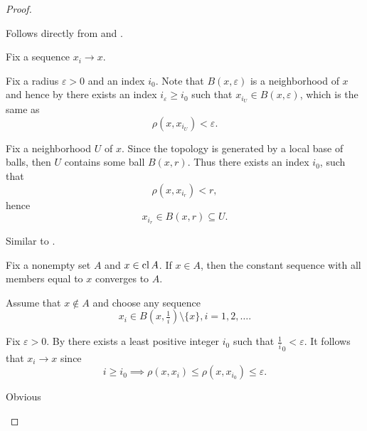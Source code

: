 \begin{proof}\mbox{}
  \begin{description}
     Follows directly from  and .

     Fix a sequence \( x_i \to x \).

    \begin{description}
      \Implies Fix a radius \( \varepsilon > 0 \) and an index \( i_0 \). Note that \( B(x, \varepsilon) \) is a neighborhood of \( x \) and hence by  there exists an index \( i_\varepsilon \geq i_0 \) such that \( x_{i_U} \in B(x, \varepsilon) \), which is the same as
      \begin{equation*}
        \rho(x, x_{i_U}) < \varepsilon.
      \end{equation*}

      \ImpliedBy Fix a neighborhood \( U \) of \( x \). Since the topology is generated by a local base of balls, then \( U \) contains some ball \( B(x, r) \). Thus there exists an index \( i_0 \), such that
      \begin{equation*}
        \rho(x, x_{i_r}) < r,
      \end{equation*}
      hence
      \begin{equation*}
        x_{i_r} \in B(x, r) \subseteq U.
      \end{equation*}
    \end{description}

     Similar to .

    \begin{description}
      \Implies Fix a nonempty set \( A \) and \( x \in \operatorname{cl} A \). If \( x \in A \), then the constant sequence with all members equal to \( x \) converges to \( A \).

      Assume that \( x \not\in A \) and choose any sequence\AOC
      \begin{equation*}
        x_i \in B(x, \tfrac 1 i) \setminus \{ x \}, i = 1, 2, \ldots.
      \end{equation*}

      Fix \( \varepsilon > 0 \). By  there exists a least positive integer \( i_0 \) such that \( \tfrac 1 i_0 < \varepsilon \). It follows that \( x_i \to x \) since
      \begin{equation*}
        i \geq i_0 \implies \rho(x, x_i) \leq \rho(x, x_{i_0}) \leq \varepsilon.
      \end{equation*}

      \ImpliedBy Obvious
    \end{description}
  \end{description}
\end{proof}

